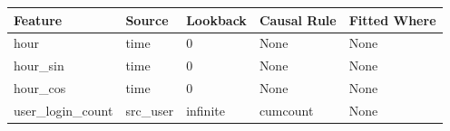 \begin{tabular}{lllll}
\toprule
Feature & Source & Lookback & Causal Rule & Fitted Where \\
\midrule
hour & time & 0 & None & None \\
hour_sin & time & 0 & None & None \\
hour_cos & time & 0 & None & None \\
user_login_count & src_user & infinite & cumcount & None \\
\bottomrule
\end{tabular}
